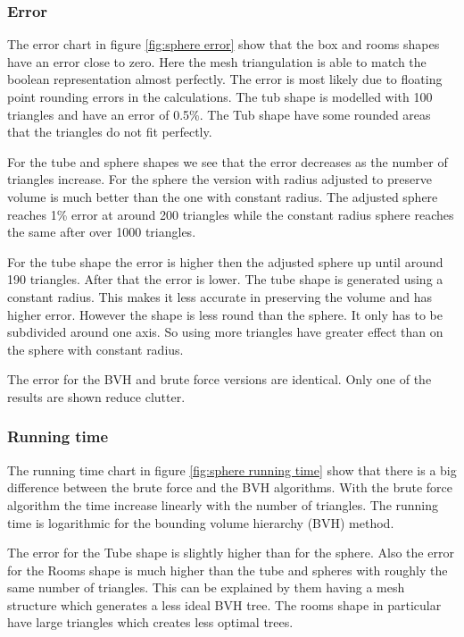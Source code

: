 \documentclass[11pt,twoside,a4paper]{report}
\begin{document}
\subsubsection{Error}
The error chart in figure \ref{fig:sphere error} show that the box and rooms shapes have an error close to zero. Here the mesh triangulation is able to match the boolean representation almost perfectly. The error is most likely due to floating point rounding errors in the calculations. The tub shape is modelled with 100 triangles and have an error of 0.5\%. The Tub shape have some rounded areas that the triangles do not fit perfectly.

For the tube and sphere shapes we see that the error decreases as the number of triangles increase. For the sphere the version with radius adjusted to preserve volume is much better than the one with constant radius. The adjusted sphere reaches 1\% error at around 200 triangles while the constant radius sphere reaches the same after over 1000 triangles.

For the tube shape the error is higher then the adjusted sphere up until around 190 triangles. After that the error is lower. The tube shape is generated using a constant radius. This makes it less accurate in preserving the volume and has higher error. However the shape is less round than the sphere. It only has to be subdivided around one axis. So using more triangles have greater effect than on the sphere with constant radius.

The error for the BVH and brute force versions are identical. Only one of the results are shown reduce clutter.

\subsubsection{Running time}
The running time chart in figure \ref{fig:sphere running time} show that there is a big difference between the brute force and the BVH algorithms. With the brute force algorithm the time increase linearly with the number of triangles. The running time is logarithmic for the bounding volume hierarchy (BVH) method. 

The error for the Tube shape is slightly higher than for the sphere. Also the error for the Rooms shape is much higher than the tube and spheres with roughly the same number of triangles. This can be explained by them having a mesh structure which generates a less ideal BVH tree. The rooms shape in particular have large triangles which creates less optimal trees.
\end{document}
